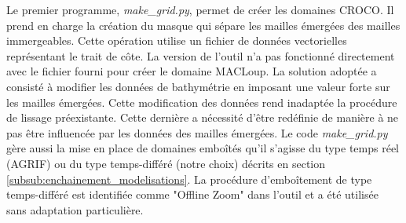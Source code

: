 \documentclass[10pt,a4paper,titlepage]{article}
\begin{document}
Le premier programme, \textit{make\_grid.py}, permet de créer les domaines CROCO.
Il prend en charge la création du masque qui sépare les mailles émergées des mailles immergeables.
Cette opération utilise un fichier de données vectorielles représentant le trait de côte.
La version de l'outil n'a pas fonctionné directement avec le fichier fourni pour créer le domaine MACLoup.
La solution adoptée a consisté à modifier les données de bathymétrie en imposant une valeur forte sur les mailles émergées.
Cette modification des données rend inadaptée la procédure de lissage préexistante.
Cette dernière a nécessité d'être redéfinie de manière à ne pas être influencée par les données des mailles émergées.
Le code \textit{make\_grid.py} gère aussi la mise en place de domaines emboîtés qu'il s'agisse du type temps réel (AGRIF) ou du type temps-différé (notre choix) décrits en section \ref{subsub:enchainement_modelisations}.
La procédure d’emboîtement de type temps-différé est identifiée comme "Offline Zoom" dans l'outil
et a été utilisée sans adaptation particulière.
\end{document}
